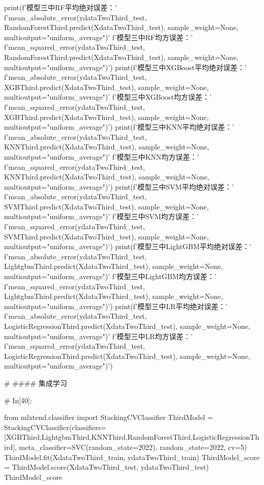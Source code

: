 \documentclass{MathorCupmodeling}
\begin{document}
\begin{python}
print(f'模型三中RF平均绝对误差：'
      f'{mean_absolute_error(ydataTwoThird_test, RandomForestThird.predict(XdataTwoThird_test), sample_weight=None, multioutput="uniform_average")}\n'
      f'模型三中RF均方误差：'
      f'{mean_squared_error(ydataTwoThird_test, RandomForestThird.predict(XdataTwoThird_test), sample_weight=None, multioutput="uniform_average")}')
print(f'模型三中XGBoost平均绝对误差：'
      f'{mean_absolute_error(ydataTwoThird_test, XGBThird.predict(XdataTwoThird_test), sample_weight=None, multioutput="uniform_average")}\n'
      f'模型三中XGBoost均方误差：'
      f'{mean_squared_error(ydataTwoThird_test, XGBThird.predict(XdataTwoThird_test), sample_weight=None, multioutput="uniform_average")}')
print(f'模型三中KNN平均绝对误差：'
      f'{mean_absolute_error(ydataTwoThird_test, KNNThird.predict(XdataTwoThird_test), sample_weight=None, multioutput="uniform_average")}\n'
      f'模型三中KNN均方误差：'
      f'{mean_squared_error(ydataTwoThird_test, KNNThird.predict(XdataTwoThird_test), sample_weight=None, multioutput="uniform_average")}')
print(f'模型三中SVM平均绝对误差：'
      f'{mean_absolute_error(ydataTwoThird_test, SVMThird.predict(XdataTwoThird_test), sample_weight=None, multioutput="uniform_average")}\n'
      f'模型三中SVM均方误差：'
      f'{mean_squared_error(ydataTwoThird_test, SVMThird.predict(XdataTwoThird_test), sample_weight=None, multioutput="uniform_average")}')
print(f'模型三中LightGBM平均绝对误差：'
      f'{mean_absolute_error(ydataTwoThird_test, LightgbmThird.predict(XdataTwoThird_test), sample_weight=None, multioutput="uniform_average")}\n'
      f'模型三中LightGBM均方误差：'
      f'{mean_squared_error(ydataTwoThird_test, LightgbmThird.predict(XdataTwoThird_test), sample_weight=None, multioutput="uniform_average")}')
print(f'模型三中LR平均绝对误差：'
      f'{mean_absolute_error(ydataTwoThird_test, LogisticRegressionThird.predict(XdataTwoThird_test), sample_weight=None, multioutput="uniform_average")}\n'
      f'模型三中LR均方误差：'
      f'{mean_squared_error(ydataTwoThird_test, LogisticRegressionThird.predict(XdataTwoThird_test), sample_weight=None, multioutput="uniform_average")}')


# #### 集成学习

# In[40]:


from mlxtend.classifier import StackingCVClassifier
ThirdModel = StackingCVClassifier(classifiers=[XGBThird,LightgbmThird,KNNThird,RandomForestThird,LogisticRegressionThird], meta_classifier=SVC(random_state=2022), random_state=2022, cv=5)
ThirdModel.fit(XdataTwoThird_train, ydataTwoThird_train)
ThirdModel_score = ThirdModel.score(XdataTwoThird_test, ydataTwoThird_test)
ThirdModel_score



\end{python}
\end{document}
